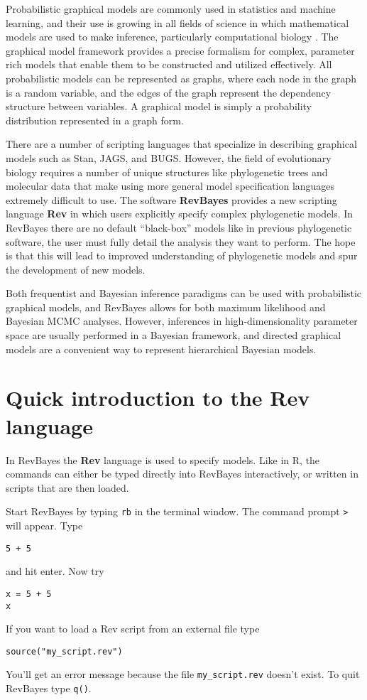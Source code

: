 \documentclass[11pt]{article}
\begin{document}
Probabilistic graphical models are commonly used in statistics and machine learning,
and their use is growing in all fields of science in which mathematical models
are used to make inference, particularly computational biology \citep{jordan2004graphical, airoldi2007getting}.
The graphical model framework provides a precise formalism
for complex, parameter rich models that enable them
to be constructed and utilized effectively. 
All probabilistic models can be represented as graphs,
where each node in the graph is a random variable, and the edges of the graph represent
the dependency structure between variables.
A graphical model is simply a probability distribution represented in a graph form.

There are a number of scripting languages that specialize in
describing graphical models such as Stan, JAGS, and BUGS.
However, the field of evolutionary biology requires a number of unique structures
like phylogenetic trees and molecular data that make using 
more general model specification languages extremely difficult to use.
The software \textbf{RevBayes} \citep{hohna2014probabilistic} provides a new scripting language \textbf{Rev}
in which users explicitly specify complex phylogenetic models.
In RevBayes there are no default ``black-box'' models like in previous
phylogenetic software, the user must fully detail the analysis they want to perform.
The hope is that this will lead to improved understanding of phylogenetic
models and spur the development of new models. 

Both frequentist and Bayesian inference paradigms
can be used with probabilistic graphical models,
and RevBayes allows for both maximum likelihood
and Bayesian MCMC analyses.
However, inferences in high-dimensionality
parameter space are usually performed in a Bayesian framework,
and directed graphical models are a convenient way
to represent hierarchical Bayesian models.

\section{Quick introduction to the Rev language}

In RevBayes the \textbf{Rev} language is used to specify
models.
Like in R, the commands can either be typed directly into
RevBayes interactively,
or written in scripts that are then loaded.

Start RevBayes by typing \texttt{rb} in the terminal window.
The command prompt \texttt{>} will appear. Type
\begin{verbatim}
5 + 5
\end{verbatim}
and hit enter. Now try
\begin{verbatim}
x = 5 + 5
x
\end{verbatim}
If you want to load a Rev script from an external file type
\begin{verbatim}
source("my_script.rev")
\end{verbatim}
You'll get an error message because the file \texttt{my\_script.rev}
doesn't exist.
To quit RevBayes type \texttt{q()}.
\end{document}
